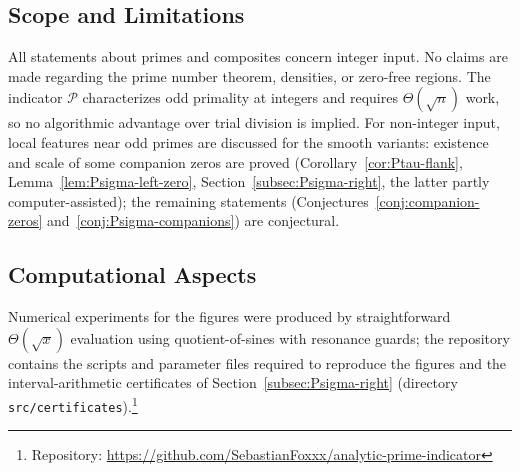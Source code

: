 \subsection*{Scope and Limitations}
All statements about primes and composites concern integer input. No claims are made regarding the prime number theorem, densities, or zero-free regions. The indicator $\mathcal P$ characterizes odd primality at integers and requires $\Theta(\sqrt n)$ work, so no algorithmic advantage over trial division is implied. For non-integer input, local features near odd primes are discussed for the smooth variants: existence and scale of some companion zeros are proved (Corollary~\ref{cor:Ptau-flank}, Lemma~\ref{lem:Psigma-left-zero}, Section~\ref{subsec:Psigma-right}, the latter partly computer-assisted); the remaining statements (Conjectures~\ref{conj:companion-zeros} and~\ref{conj:Psigma-companions}) are conjectural.

\subsection*{Computational Aspects}
Numerical experiments for the figures were produced by straightforward \(\Theta(\sqrt{x})\) evaluation using quotient-of-sines with resonance guards; the repository contains the scripts and parameter files required to reproduce the figures and the interval-arithmetic certificates of Section~\ref{subsec:Psigma-right} (directory \texttt{src/certificates}).\footnote{Repository: \url{https://github.com/SebastianFoxxx/analytic-prime-indicator}}


